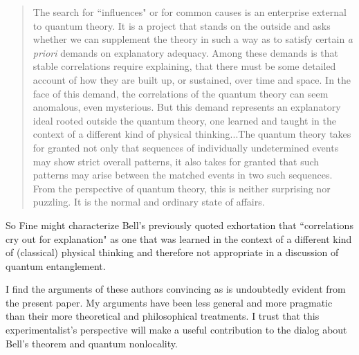 \documentclass[12pt]{article}
\begin{document}
\begin{quote}
The search for ``influences" or for common causes is an enterprise external to quantum theory.  It is a project that stands on the outside and asks whether we can supplement the theory in such a way as to satisfy certain {\it a priori} demands on explanatory adequacy.  Among these demands is that stable correlations require explaining, that there must be some detailed account of how they are built up, or sustained, over time and space.  In the face of this demand, the correlations of the quantum theory can seem anomalous, even mysterious.  But this demand represents an explanatory ideal rooted outside the quantum theory, one learned and taught in the context of a different kind of physical thinking...The quantum theory takes for granted not only that sequences of individually undetermined events may show strict overall patterns, it also takes for granted that such patterns may arise between the matched events in two such sequences.  From the perspective of quantum theory, this is neither surprising nor puzzling.  It is the normal and ordinary state of affairs.
\end{quote}
So Fine might characterize Bell's previously quoted exhortation that ``correlations cry out for explanation" as one that was learned in the context of a different kind of (classical) physical thinking and therefore not appropriate in a discussion of quantum entanglement.

I find the arguments of these authors convincing as is undoubtedly evident from the present paper.  My arguments have been less general and more pragmatic than their more theoretical and philosophical treatments.  I trust that this experimentalist's perspective will make a useful contribution to the dialog about Bell's theorem and quantum nonlocality.

\vspace{7 mm}
\end{document}
